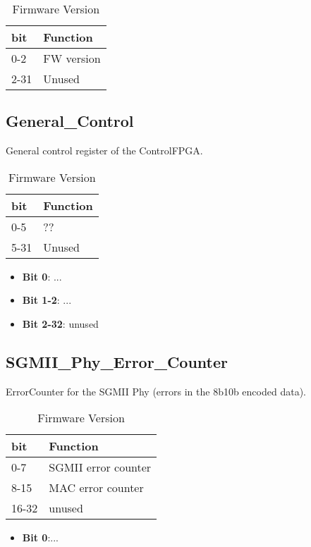 \begin {table}[H]
\begin{center}
\caption {Firmware Version}
\label{reg_4}
\begin{tabular}{|l|l|}
\hline
\textbf{bit} & \textbf{Function} \\
\hline
0-2 & FW version \\
\hline
2-31& Unused  \\
\hline
\end{tabular}
\end{center}
\end{table}



\subsection{General\_Control}
General control register of the ControlFPGA.

\begin {table}[H]
\begin{center}
\caption {Firmware Version}
\label{reg_4}
\begin{tabular}{|l|l|}
\hline
\textbf{bit} & \textbf{Function} \\
\hline
0-5 & ?? \\
\hline
5-31& Unused  \\
\hline
\end{tabular}
\end{center}
\end{table}
%
\begin{itemize}
\item \textbf{Bit 0}: ...
\item \textbf{Bit 1-2}: ...
\item \textbf{Bit 2-32}: unused
\end{itemize}


\subsection{SGMII\_Phy\_Error\_Counter}
ErrorCounter for the SGMII Phy (errors in the 8b10b encoded data).
%
%
\begin {table}[H]
\begin{center}
\caption {Firmware Version}
\label{reg_4}
\begin{tabular}{|l|l|}
\hline
\textbf{bit} & \textbf{Function} \\
\hline
0-7 & SGMII error counter\\
\hline
8-15 & MAC error counter \\
\hline
16-32 & unused \\
\end{tabular}
\end{center}
\end{table}
%
\begin{itemize}
\item \textbf{Bit 0}:...
\end{itemize}
%
